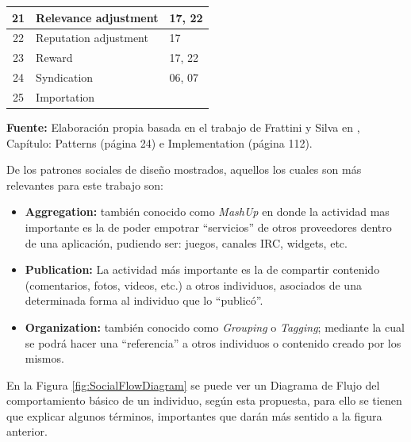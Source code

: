 \documentclass[oneside,12pt,a4paper]{memoir}%
\begin{document}
\begin{enumerate}
\begin{table}[htbp]
\begin{tabular}{|c|l|l|}
				21 & Relevance adjustment & 17, 22 \\ \hline
				22 & Reputation adjustment & 17 \\ \hline
				23 & Reward & 17, 22 \\ \hline
				24 & Syndication & 06, 07 \\ \hline
				25 & Importation &  \\ \hline
			\end{tabular}
			\newline
			\textbf{Fuente:} Elaboraci\'on propia basada en el trabajo de Frattini y
			Silva en \cite{Frattini2007}, Cap\'itulo: Patterns (p\'agina 24) e
			Implementation (p\'agina 112).
			\label{tab:socialPatternDesign}
		\end{table}
	
	  De los patrones sociales de dise\~no mostrados, aquellos los cuales son
	  m\'as relevantes para este trabajo son:
	  
	  \begin{itemize}
	    \item \textbf{Aggregation: } tambi\'en conocido como \textit{MashUp} en donde
	    la actividad mas importante es la de poder empotrar ``servicios'' de otros
	    proveedores dentro de una aplicaci\'on, pudiendo ser: juegos, canales
	    IRC, widgets, etc.
	    \item \textbf{Publication: } La actividad m\'as importante es la de
	    compartir contenido (comentarios, fotos, videos, etc.) a otros individuos, asociados
	    de una determinada forma al individuo que lo ``public\'o''.
	    \item \textbf{Organization: } tambi\'en conocido como \textit{Grouping} o
	    \textit{Tagging}; mediante la cual se podr\'a hacer una ``referencia'' a
	    otros individuos o contenido creado por los mismos.
	  \end{itemize}
	  
	  En la Figura \ref{fig:SocialFlowDiagram} se puede ver un Diagrama de Flujo
	  del comportamiento b\'asico de un individuo, seg\'un esta propuesta, para
	  ello se tienen que explicar algunos t\'erminos, importantes que dar\'an
	  m\'as sentido a la figura anterior.
	  

\end{enumerate}
\end{document}
